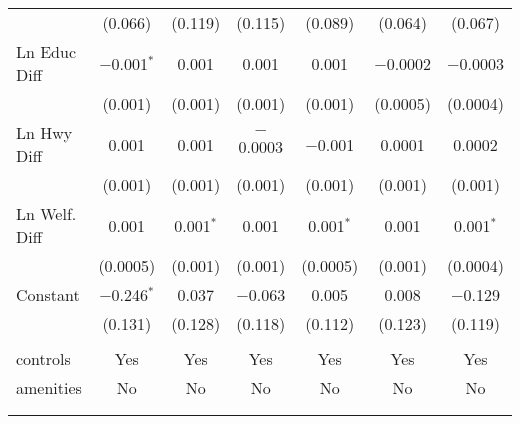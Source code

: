 \begin{table}[!htbp]
\begin{tabular}{@{\extracolsep{5pt}}lcccccc}
  & (0.066) & (0.119) & (0.115) & (0.089) & (0.064) & (0.067) \\ 
  Ln Educ Diff & $-$0.001$^{*}$ & 0.001 & 0.001 & 0.001 & $-$0.0002 & $-$0.0003 \\ 
  & (0.001) & (0.001) & (0.001) & (0.001) & (0.0005) & (0.0004) \\ 
  Ln Hwy Diff & 0.001 & 0.001 & $-$0.0003 & $-$0.001 & 0.0001 & 0.0002 \\ 
  & (0.001) & (0.001) & (0.001) & (0.001) & (0.001) & (0.001) \\ 
  Ln Welf. Diff & 0.001 & 0.001$^{*}$ & 0.001 & 0.001$^{*}$ & 0.001 & 0.001$^{*}$ \\ 
  & (0.0005) & (0.001) & (0.001) & (0.0005) & (0.001) & (0.0004) \\ 
  Constant & $-$0.246$^{*}$ & 0.037 & $-$0.063 & 0.005 & 0.008 & $-$0.129 \\ 
  & (0.131) & (0.128) & (0.118) & (0.112) & (0.123) & (0.119) \\ 
 \hline \\[-1.8ex] 
controls & Yes & Yes & Yes & Yes & Yes & Yes \\ 
amenities & No & No & No & No & No & No \\ 
\hline \\[-1.8ex] 
\hline 
\hline \\[-1.8ex] 
\end{tabular} 
\end{table} 
